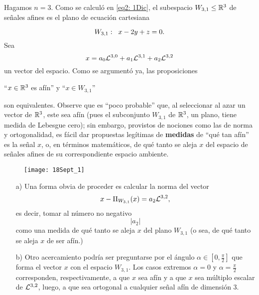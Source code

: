 \begin{ejemplo}
Hagamos $n=3$.  
Como se calculó en \eqref{eq2: 1Dic},
el subespacio $W_{3,1} \leq \mathbb{R}^{3}$ de señales afines es el plano
de ecuación cartesiana

\[
W_{3,1}: \hspace{0.2cm} x-2y+z=0.
\]
Sea 
\begin{equation*}
\label{eq0: 9Feb}
x=a_{0}\mathcal{L}^{3,0}+a_{1}\mathcal{L}^{3,1}+a_{2}\mathcal{L}^{3,2}
\end{equation*}
un vector del espacio.
Como se argumentó ya, las proposiciones
\begin{center}
``$x \in \mathbb{R}^{3}$ es afín'' \hspace{0.2cm} y \hspace{0.2cm} 
``$x \in W_{3,1}$''
\end{center} 
son equivalentes.
Observe que es ``poco probable'' que, al seleccionar al azar
un vector de $\mathbb{R}^{3}$, este sea afín (pues el 
subconjunto $W_{3,1}$ de $\mathbb{R}^{3}$,
un plano, tiene
medida de Lebesgue cero); sin embargo, provistos
de nociones como las de norma y ortogonalidad, es fácil dar 
propuestas legítimas de
\textbf{medidas} de ``qué tan afín'' es la señal $x$,
o, en términos matemáticos, de qué tanto se aleja
$x$ del espacio de señales afines de su correspondiente
espacio ambiente.

\begin{figure}[H]
	\centering
	\texttt{[image:  18Sept\_1]} 
\end{figure}	


\begin{itemize}
\item[a)] Una forma obvia de proceder es calcular la norma
del vector 
\[
x - \Pi_{W_{3,1}}(x)= a_{2} \mathcal{L}^{3,2},
\]
es decir, tomar al número no negativo
\[
|a_{2}|
\]
como una medida de qué tanto se aleja $x$ del plano $W_{3,1}$
(o sea, de qué tanto se aleja $x$ de ser afín.)

\item[b)] Otro acercamiento podría ser preguntarse por
el ángulo $\alpha \in [0, \frac{\pi}{2}]$ 
que forma el vector $x$ con el espacio 
$W_{3,1}$. Los casos extremos $\alpha=0$ y $\alpha= \frac{\pi}{2}$
corresponden, respectivamente, a que $x$ sea afín y
a que $x$ sea múltiplo escalar de $\mathcal{L}^{3,2}$, luego,
a que sea ortogonal a cualquier señal afín de dimensión 3.


\end{itemize}
\end{ejemplo}
